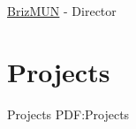 \documentclass[a4paper,10pt,oneside]{article}
\begin{document}
\begin{body}
\par \href{http://www.brizmun.com/}{BrizMUN} - Director \hfill {}














\section
{Projects}
{Projects}
{PDF:Projects}



\end{body}
\end{document}
